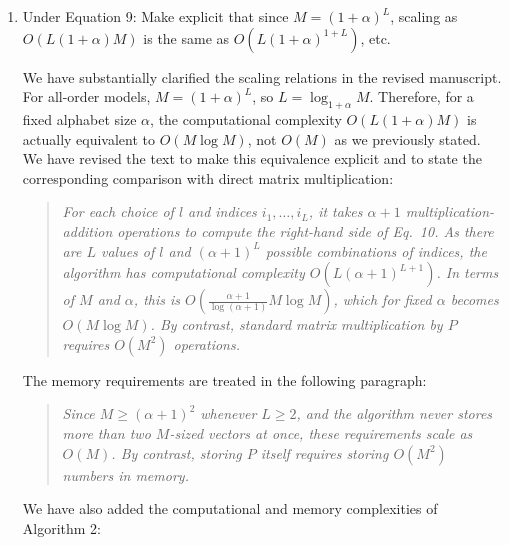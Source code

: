 \documentclass[11pt]{article}
\newenvironment{response}{\par\color{responseblue}}{\par}
\newenvironment{msquote}
  {\begin{quote}\color{responseblue}\itshape\noindent\ignorespaces}
  {\end{quote}}
\begin{document}
\begin{enumerate}
\item Under Equation 9: Make explicit that since $M = (1+\alpha)^L$, scaling as
$O(L(1+\alpha)M)$ is the same as $O(L(1+\alpha)^{1+L})$, etc.

\begin{response}
We have substantially clarified the scaling relations in the revised manuscript. For all-order models,
$M=(1+\alpha)^L$, so $L=\log_{1+\alpha} M$. Therefore, for a fixed alphabet size
$\alpha$, the computational complexity $O(L(1+\alpha)M)$ is actually equivalent to
$O(M \log M)$, not $O(M)$ as we previously stated. We have revised the text to make this equivalence explicit and to
state the corresponding comparison with direct matrix multiplication:
\end{response}

\begin{msquote}
For each choice of $l$ and indices $i_1, \ldots, i_L$, it takes $\alpha + 1$
multiplication-addition operations to compute the right-hand side of Eq.~10. As
there are $L$ values of $l$ and $(\alpha+1)^L$ possible combinations of indices,
the algorithm has computational complexity $O(L(\alpha+1)^{L+1})$. In terms of
$M$ and $\alpha$, this is $O(\frac{\alpha+1}{\log (\alpha+1)} M \log M)$, which
for fixed $\alpha$ becomes $O(M \log M)$. By contrast, standard matrix multiplication by $P$ requires $O(M^2)$ operations.
\end{msquote}

\begin{response}
The memory requirements are treated in the following paragraph:
\end{response}

\begin{msquote}
Since $M \geq (\alpha+1)^2$ whenever $L \geq 2$, and the algorithm never stores
more than two $M$-sized vectors at once, these requirements scale as $O(M)$. By
contrast, storing $P$ itself requires storing $O(M^2)$ numbers in memory.
\end{msquote}

\begin{response}
We have also added the computational and memory complexities of Algorithm 2:
\end{response}


\end{enumerate}
\end{document}
